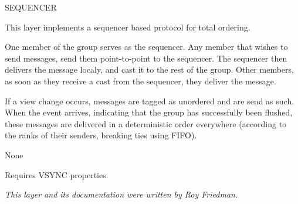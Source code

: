 \begin{Layer}{SEQUENCER}

This layer implements a sequencer based protocol for total ordering.

\begin{Protocol}
One member of the group serves as the sequencer. Any member that wishes to
send messages, send them point-to-point to the sequencer. The sequencer then
delivers the message localy, and cast it to the rest of the group. Other
members, as soon as they receive a cast from the sequencer, they deliver
the message.

If a view change occurs, messages are tagged as unordered and are send as
such.
When the  event arrives, indicating that the group has successfully
been flushed, these messages are delivered in a deterministic order everywhere
(according to the ranks of their senders, breaking ties using FIFO).
\end{Protocol}

\begin{Parameters}
\item None
\end{Parameters}

\begin{Properties}
\item
Requires VSYNC properties.
\end{Properties}

\begin{Sources}
\end{Sources}

\begin{GenEvent}
\end{GenEvent}

\begin{Testing}
\item
\todo{}
\end{Testing}

\emph{This layer and its documentation were written by Roy Friedman.}
\end{Layer}
